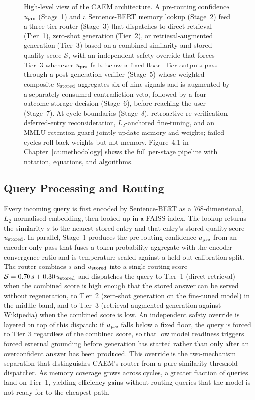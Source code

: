 \begin{figure}[p]
{{\begin{tikzpicture}
\end{tikzpicture}
}%
}

\vspace{0.3cm}

{\small\caption[CAEM Architecture (High-Level View)]{High-level view of the CAEM architecture. A pre-routing confidence $u_{\text{pre}}$ (Stage~1) and a Sentence-BERT memory lookup (Stage~2) feed a three-tier router (Stage~3) that dispatches to direct retrieval (Tier~1), zero-shot generation (Tier~2), or retrieval-augmented generation (Tier~3) based on a combined similarity-and-stored-quality score $\mathcal{S}$, with an independent safety override that forces Tier~3 whenever $u_{\text{pre}}$ falls below a fixed floor. Tier outputs pass through a post-generation verifier (Stage~5) whose weighted composite $u_{\text{stored}}$ aggregates six of nine signals and is augmented by a separately-consumed contradiction veto, followed by a four-outcome storage decision (Stage~6), before reaching the user (Stage~7). At cycle boundaries (Stage~8), retroactive re-verification, deferred-entry reconsideration, $L_2$-anchored fine-tuning, and an MMLU retention guard jointly update memory and weights; failed cycles roll back weights but not memory. Figure~4.1 in Chapter~\ref{ch:methodology} shows the full per-stage pipeline with notation, equations, and algorithms.}}
\label{fig:architecture}
\end{figure}

\subsection{Query Processing and Routing}

Every incoming query is first encoded by Sentence-BERT as a 768-dimensional, $L_2$-normalised embedding, then looked up in a FAISS index. The lookup returns the similarity $s$ to the nearest stored entry and that entry's stored-quality score $u_{\text{stored}}$. In parallel, Stage~1 produces the pre-routing confidence $u_{\text{pre}}$ from an encoder-only pass that fuses a token-probability aggregate with the encoder convergence ratio and is temperature-scaled against a held-out calibration split. The router combines $s$ and $u_{\text{stored}}$ into a single routing score $\mathcal{S} = 0.70\,s + 0.30\,u_{\text{stored}}$ and dispatches the query to Tier~1 (direct retrieval) when the combined score is high enough that the stored answer can be served without regeneration, to Tier~2 (zero-shot generation on the fine-tuned model) in the middle band, and to Tier~3 (retrieval-augmented generation against Wikipedia) when the combined score is low. An independent safety override is layered on top of this dispatch: if $u_{\text{pre}}$ falls below a fixed floor, the query is forced to Tier~3 regardless of the combined score, so that low model readiness triggers forced external grounding before generation has started rather than only after an overconfident answer has been produced. This override is the two-mechanism separation that distinguishes CAEM's router from a pure similarity-threshold dispatcher. As memory coverage grows across cycles, a greater fraction of queries land on Tier~1, yielding efficiency gains without routing queries that the model is not ready for to the cheapest path.

